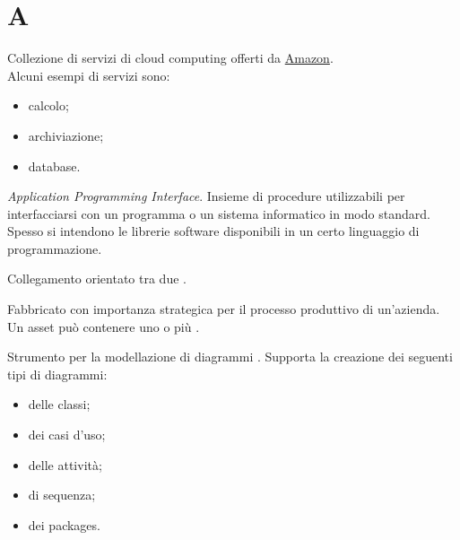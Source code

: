 \section{A}


Collezione di servizi di cloud computing offerti da \href{https://aws.amazon.com/it/}{Amazon}. \\
Alcuni esempi di servizi sono:
\begin{itemize}
	\item calcolo;
	\item archiviazione;
	\item database.
\end{itemize}

\textit{Application Programming Interface}. Insieme di procedure utilizzabili per interfacciarsi con un programma o un sistema informatico in modo standard. Spesso si intendono le librerie software disponibili in un certo linguaggio di programmazione.

Collegamento orientato tra due .

Fabbricato con importanza strategica per il processo produttivo di un'azienda. Un asset può contenere uno o più .

Strumento per la modellazione di diagrammi . Supporta la creazione dei seguenti tipi di diagrammi:
\begin{itemize}
	\item delle classi;
	\item dei casi d'uso;
	\item delle attività;
	\item di sequenza;
	\item dei packages.
\end{itemize} 
